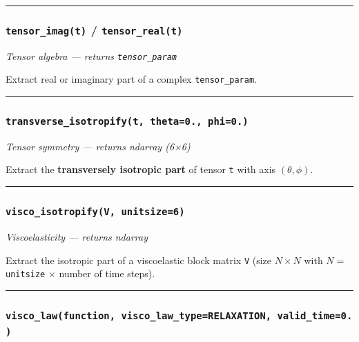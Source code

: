 \documentclass[
  a4paper,
  numbers=noendperiod,
  DIV=12]{scrreprt}
\begin{document}
\begin{center}\rule{0.5\linewidth}{0.5pt}\end{center}

\subsubsection{\texorpdfstring{\texttt{tensor\_imag(t)} /
\texttt{tensor\_real(t)}}{tensor\_imag(t) / tensor\_real(t)}}\label{api-tensor-real-imag}

\emph{Tensor algebra --- returns \texttt{tensor\_param}}

Extract real or imaginary part of a complex \texttt{tensor\_param}.

\begin{center}\rule{0.5\linewidth}{0.5pt}\end{center}

\subsubsection{\texorpdfstring{\texttt{transverse\_isotropify(t,\ theta=0.,\ phi=0.)}}{transverse\_isotropify(t, theta=0., phi=0.)}}\label{api-transverse-isotropify}

\emph{Tensor symmetry --- returns ndarray (6×6)}

Extract the \textbf{transversely isotropic part} of tensor \texttt{t}
with axis \((\theta,\phi)\).

\begin{center}\rule{0.5\linewidth}{0.5pt}\end{center}

\subsubsection{\texorpdfstring{\texttt{visco\_isotropify(V,\ unitsize=6)}}{visco\_isotropify(V, unitsize=6)}}\label{api-visco-isotropify}

\emph{Viscoelasticity --- returns ndarray}

Extract the isotropic part of a viscoelastic block matrix \texttt{V}
(size \(N\times N\) with \(N=\) \texttt{unitsize} × number of time
steps).

\begin{center}\rule{0.5\linewidth}{0.5pt}\end{center}

\subsubsection{\texorpdfstring{\texttt{visco\_law(function,\ visco\_law\_type=RELAXATION,\ valid\_time=0.)}}{visco\_law(function, visco\_law\_type=RELAXATION, valid\_time=0.)}}\label{api-visco-law}
\end{document}
